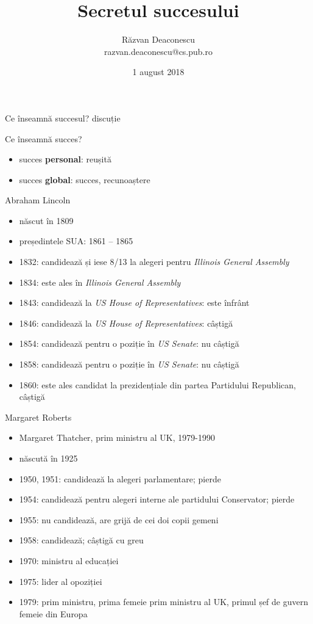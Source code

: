 \documentclass[handout]{beamer}
\title[Secretul succesului]{Secretul succesului}
\institute{InfoEducație 2018 (Gălăciuc, Vrancea)}
\author[Răzvan Deaconescu]{Răzvan Deaconescu \\
razvan.deaconescu@cs.pub.ro}
\date{1 august 2018}
\begin{document}
\frame{\titlepage}

\begin{frame}{Ce înseamnă succesul?}
  \centering
  \Large{discuție}
\end{frame}

\begin{frame}{Ce înseamnă succes?}
  \begin{itemize}
    \pause \item succes \textbf{personal}: reușită
    \pause \item succes \textbf{global}: succes, recunoaștere
  \end{itemize}
\end{frame}

\begin{frame}{Abraham Lincoln}
  \begin{itemize}
    \pause \item născut în 1809
    \pause \item președintele SUA: 1861 -- 1865
    \pause \item 1832: candidează și iese 8/13 la alegeri pentru \textit{Illinois General Assembly}
    \pause \item 1834: este ales în \textit{Illinois General Assembly}
    \pause \item 1843: candidează la \textit{US House of Representatives}: este înfrânt
    \pause \item 1846: candidează la \textit{US House of Representatives}: câștigă
    \pause \item 1854: candidează pentru o poziție în \textit{US Senate}: nu câștigă
    \pause \item 1858: candidează pentru o poziție în \textit{US Senate}: nu câștigă
    \pause \item 1860: este ales candidat la prezidențiale din partea Partidului Republican, câștigă
  \end{itemize}
\end{frame}

\begin{frame}{Margaret Roberts}
  \begin{itemize}
    \pause \item Margaret Thatcher, prim ministru al UK, 1979-1990
    \pause \item născută în 1925
    \pause \item 1950, 1951: candidează la alegeri parlamentare; pierde
    \pause \item 1954: candidează pentru alegeri interne ale partidului Conservator; pierde
    \pause \item 1955: nu candidează, are grijă de cei doi copii gemeni
    \pause \item 1958: candidează; câștigă cu greu
    \pause \item 1970: ministru al educației
    \pause \item 1975: lider al opoziției
    \pause \item 1979: prim ministru, prima femeie prim ministru al UK, primul șef de guvern femeie din Europa
  \end{itemize}
\end{frame}
\end{document}
